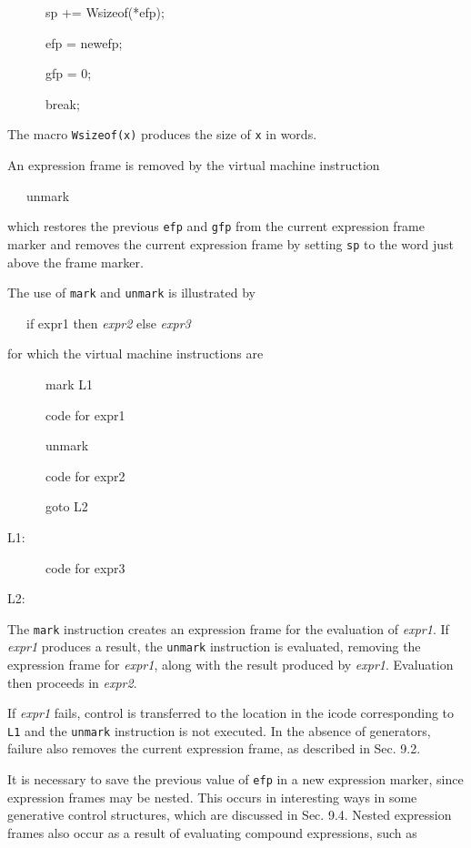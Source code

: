{\ttfamily\mdseries
\ \ \ \ \ \ sp += Wsizeof(*efp);}

{\ttfamily\mdseries
\ \ \ \ \ \ efp = newefp;}

{\ttfamily\mdseries
\ \ \ \ \ \ gfp = 0;}

{\ttfamily\mdseries
\ \ \ \ \ \ break;}

The macro \texttt{Wsizeof(x)} produces the size of \texttt{x} in words.

An expression frame is removed by the virtual machine instruction

{\ttfamily\mdseries
\ \ \ unmark}

\noindent which restores the previous \texttt{efp} and \texttt{gfp}
from the current expression frame marker and removes the current
expression frame by setting \texttt{sp} to the word just above the
frame marker.

The use of \texttt{mark} and \texttt{unmark} is illustrated by

{\ttfamily\mdseries
\ \ \ if expr1 then \textit{expr2 }else \textit{expr3}}

\noindent for which the virtual machine instructions are

{\ttfamily\mdseries
\ \ \ \ \ \ mark L1}

{\ttfamily\mdseries
\ \ \ \ \ \ code for expr1}

{\ttfamily\mdseries
\ \ \ \ \ \ unmark}

{\ttfamily\mdseries
\ \ \ \ \ \ code for expr2}

{\ttfamily\mdseries
\ \ \ \ \ \ goto L2}

{\ttfamily\mdseries
L1:}

{\ttfamily\mdseries
\ \ \ \ \ \ code for expr3}

{\ttfamily\mdseries
L2:}

The \texttt{mark} instruction creates an expression frame for the
evaluation of \textit{expr1}. If \textit{expr1} produces a result, the
\texttt{unmark} instruction is evaluated, removing the expression
frame for \textit{expr1}, along with the result produced by
\textit{expr1}. Evaluation then proceeds in \textit{expr2}.

If \textit{expr1} fails, control is transferred to the location in the
icode corresponding to \texttt{L1} and the \texttt{unmark} instruction
is not executed. In the absence of generators, failure also removes
the current expression frame, as described in Sec. 9.2.


It is necessary to save the previous value of \texttt{efp} in a new
expression marker, since expression frames may be nested. This occurs
in interesting ways in some generative control structures, which are
discussed in Sec. 9.4. Nested expression frames also occur as a result
of evaluating compound expressions, such as

